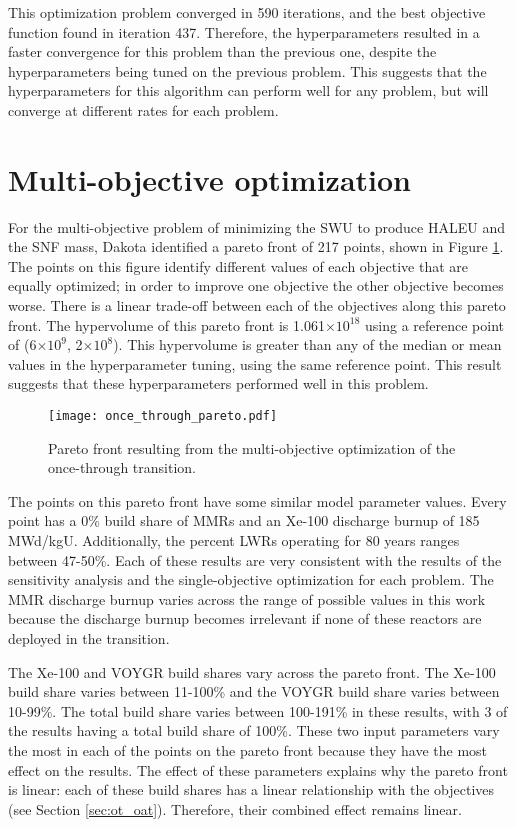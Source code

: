 This optimization problem converged in 590 iterations, and the best objective 
function found in iteration 437. Therefore, the hyperparameters resulted 
in a faster convergence for this problem than the previous one, despite the 
hyperparameters being tuned on the previous problem. This suggests that 
the hyperparameters for this algorithm can perform well for any problem, 
but will converge at different rates for each problem. 

\section{Multi-objective optimization}
For the multi-objective problem of minimizing the \gls{SWU} to produce 
\gls{HALEU} and the \gls{SNF} mass, Dakota identified a pareto front 
of 217 points, shown in Figure \ref{fig:once_through_pareto}. The points 
on this figure identify different values of each objective that are equally 
optimized; in order to improve one objective the other objective becomes 
worse. There is a linear trade-off between each of the objectives along this 
pareto front. 
The hypervolume of this pareto front is 1.061$\times 10^18$ using a 
reference point of (6$\times 10^9$, 2$\times 10^8$). This hypervolume is 
greater than any of the median or mean values in the hyperparameter tuning,
using the same reference point. This result suggests that these hyperparameters 
performed well in this problem. 


\begin{figure}[ht]
    \centering 
    \texttt{[image: once\_through\_pareto.pdf]}
    \caption{Pareto front resulting from the multi-objective optimization 
    of the once-through transition.}
    \label{fig:once_through_pareto}
\end{figure}

The points on this pareto front have some similar model parameter values. 
Every point has a 0\% build share of \glspl{MMR} and an Xe-100 discharge 
burnup of 185 MWd/kgU. Additionally, the percent \glspl{LWR} operating 
for 80 years ranges between 47-50\%. Each of these results are very 
consistent with the results of the sensitivity analysis and the 
single-objective optimization for each problem. The \gls{MMR} discharge burnup varies 
across the range of possible values in this work because the discharge 
burnup becomes irrelevant if none of these reactors are deployed in the
transition.

The Xe-100 and VOYGR build shares vary across the pareto front. The Xe-100 
build share varies between 11-100\% and the VOYGR build share varies 
between 10-99\%. The total build share varies between 100-191\% in these 
results, with 3 of the results having a total build share of 100\%. 
These two input parameters vary the most in each of the points on 
the pareto front because they have the most effect on the results. The effect of 
these parameters explains why the pareto front is linear: each of these 
build shares has a linear relationship with the objectives (see Section 
\ref{sec:ot_oat}). Therefore, their combined effect remains linear.

